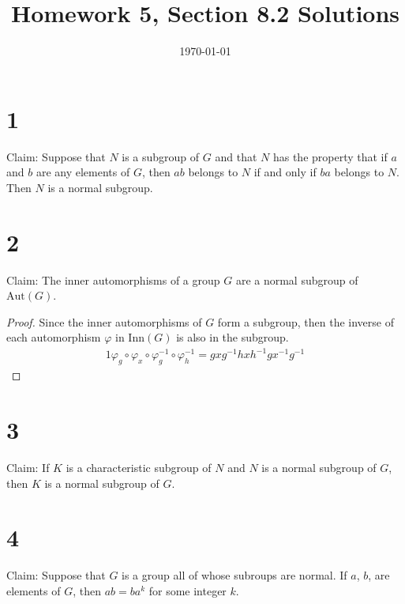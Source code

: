 \documentclass{article}
\title{\textbf{Homework 5, Section 8.2 Solutions}}
\date{}
\date\today
\begin{document}
\maketitle %

\thispagestyle{firstpage}
\section*{1}

Claim: Suppose that $N$ is a subgroup of $G$ and that $N$ has the property that if $a$ and $b$ are any elements of $G$, then $ab$ belongs 
to $N$ if and only if $ba$ belongs to $N$.  Then $N$ is a normal subgroup.





\section*{2}

Claim: The inner automorphisms of a group $G$ are a normal subgroup of $\mathrm{Aut}(G)$. 

\begin{proof}
  Since the inner automorphisms of $G$ form a subgroup, then the inverse of each automorphism $\varphi$ in $\mathrm{Inn}(G)$ 
  is also in the subgroup.
  \begin{alignat*}{1}
    \varphi_g \circ \varphi_x \circ \varphi_g ^{-1} \circ \varphi_h^{-1} = gxg^{-1}hxh^{-1}gx^{-1}g^{-1}
  \end{alignat*}
\end{proof}

\section*{3}

Claim: If $K$ is a characteristic subgroup of $N$ and $N$ is a normal subgroup of $G$, then $K$ is a normal subgroup of 
$G$. 


\section*{4} 

Claim: Suppose that $G$ is a group all of whose subroups are normal.  If $a$, $b$, are elements of $G$, then $ab = ba^k$ for 
some integer $k$.
\end{document}
